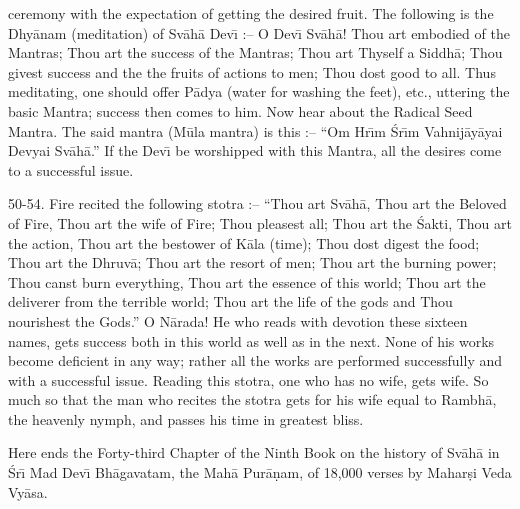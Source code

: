 ceremony with the expectation of getting the desired fruit. The following is the Dhy\=anam (meditation) of Sv\=ah\=a Dev\={\i} :-- O Dev\={\i} Sv\=ah\=a! Thou art embodied of the Mantras; Thou art the success of the Mantras; Thou art Thyself a Siddh\=a; Thou givest success and the the fruits of actions to men; Thou dost good to all. Thus meditating, one should offer P\=adya (water for washing the feet), etc., uttering the basic Mantra; success then comes to him. Now hear about the Radical Seed Mantra. The said mantra (M\=ula mantra) is this :-- ``Om Hr\={\i}m \'Sr\={\i}m Vahnij\=ay\=ayai Devyai Sv\=ah\=a.'' If the Dev\={\i} be worshipped with this Mantra, all the desires come to a successful issue.

50-54. Fire recited the following stotra :-- ``Thou art Sv\=ah\=a, Thou art the Beloved of Fire, Thou art the wife of Fire; Thou pleasest all; Thou art the \'Sakti, Thou art the action, Thou art the bestower of K\=ala (time); Thou dost digest the food; Thou art the Dhruv\=a; Thou art the resort of men; Thou art the burning power; Thou canst burn everything, Thou art the essence of this world; Thou art the deliverer from the terrible world; Thou art the life of the gods and Thou nourishest the Gods.'' O N\=arada! He who reads with devotion these sixteen names, gets success both in this world as well as in the next. None of his works become deficient in any way; rather all the works are performed successfully and with a successful issue. Reading this stotra, one who has no wife, gets wife. So much so that the man who recites the stotra gets for his wife equal to Rambh\=a, the heavenly nymph, and passes his time in greatest bliss.

Here ends the Forty-third Chapter of the Ninth Book on the history of Sv\=ah\=a in \'Sr\={\i} Mad Dev\={\i} Bh\=agavatam, the Mah\=a Pur\=a\d{n}am, of 18,000 verses by Mahar\d{s}i Veda Vy\=asa.



